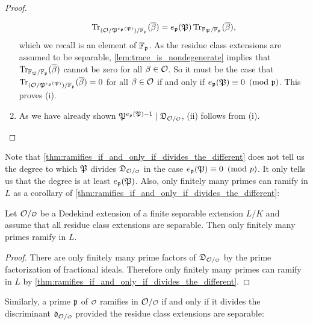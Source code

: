 \begin{proof}
\begin{enumerate}[label=(\roman*)]
        \[
          \operatorname{\mathrm{Tr}}_{(\mathcal{O}/\mathfrak{P}^{e_{\mathfrak{p}}(\mathfrak{P})})/\mathbb{F}_{\mathfrak{p}}}(\overline{\beta}) = e_{\mathfrak{p}}(\mathfrak{P})\operatorname{\mathrm{Tr}}_{\mathbb{F}_{\mathfrak{P}}/\mathbb{F}_{\mathfrak{p}}}(\overline{\beta}),
        \]
        which we recall is an element of $\mathbb{F}_{\mathfrak{p}}$. As the residue class extensions are assumed to be separable, \cref{lem:trace_is_nondegenerate} implies that $\operatorname{\mathrm{Tr}}_{\mathbb{F}_{\mathfrak{P}}/\mathbb{F}_{\mathfrak{p}}}(\overline{\beta})$ cannot be zero for all $\beta \in \mathcal{O}$. So it must be the case that $\operatorname{\mathrm{Tr}}_{(\mathcal{O}/\mathfrak{P}^{e_{\mathfrak{p}}(\mathfrak{P})})/\mathbb{F}_{\mathfrak{p}}}(\overline{\beta}) = 0$ for all $\beta \in \mathcal{O}$ if and only if $e_{\mathfrak{p}}(\mathfrak{P}) \equiv 0 \ \left(\text{mod }\mathfrak{p}\right)$. This proves (i).
        \item As we have already shown $\mf{P}^{e_{\mf{p}}(\mf{P})-1} \mid \mf{D}_{\mc{O}/\smc{O}}$, (ii) follows from (i).
      \end{enumerate}
    \end{proof}

    Note that \cref{thm:ramifies_if_and_only_if_divides_the_different} does not tell us the degree to which $\mathfrak{P}$ divides $\mf{D}_{\mc{O}/\smc{O}}$ in the case $e_{\mathfrak{p}}(\mathfrak{P}) \equiv 0 \ \left(\text{mod }p\right)$. It only tells us that the degree is at least $e_{\mathfrak{p}}(\mathfrak{P})$. Also, only finitely many primes can ramify in $L$ as a corollary of \cref{thm:ramifies_if_and_only_if_divides_the_different}:

    \begin{corollary}\label{cor:finitely_many_primes_ramify_L}
      Let $\mc{O}/\smc{O}$ be a Dedekind extension of a finite separable extension $L/K$ and assume that all residue class extensions are separable. Then only finitely many primes ramify in $L$.
    \end{corollary}
    \begin{proof}
      There are only finitely many prime factors of $\mf{D}_{\mc{O}/\smc{O}}$ by the prime factorization of fractional ideals. Therefore only finitely many primes can ramify in $L$ by \cref{thm:ramifies_if_and_only_if_divides_the_different}.
    \end{proof}

    Similarly, a prime $\mathfrak{p}$ of $\smc{O}$ ramifies in $\mc{O}/\smc{O}$ if and only if it divides the discriminant $\mf{d}_{\mc{O}/\smc{O}}$ provided the residue class extensions are separable:

